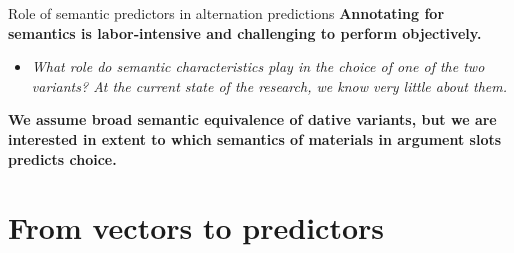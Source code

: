 \documentclass[
  ignorenonframetext,
]{beamer}
\providecommand{\tightlist}{%
  \setlength{\itemsep}{0pt}\setlength{\parskip}{0pt}}\usepackage{longtable,booktabs,array}
\begin{document}
\begin{frame}{Role of semantic predictors in alternation predictions}
\protect\hypertarget{role-of-semantic-predictors-in-alternation-predictions}{}
\textbf{Annotating for semantics is labor‐intensive and challenging to
perform objectively.}

\begin{itemize}
\tightlist
\item
  \emph{What role do semantic characteristics play in the choice of one
  of the two variants? At the current state of the research, we know
  very little about them.}
\end{itemize}

\textbf{We assume broad semantic equivalence of dative variants, but we
are interested in extent to which semantics of materials in argument
slots predicts choice.}

\end{frame}

\hypertarget{from-vectors-to-predictors}{%
\section{From vectors to predictors}\label{from-vectors-to-predictors}}
\end{document}
